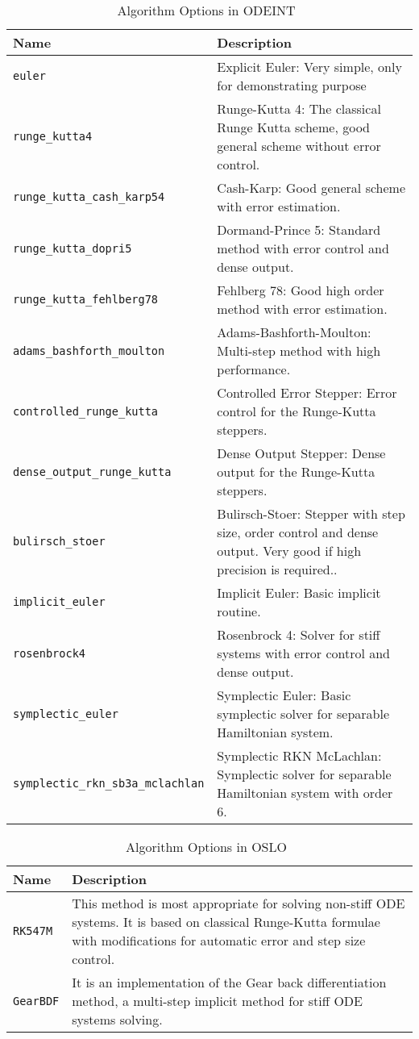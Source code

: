 \begin{table}[ht]
\begin{tabular}{ p{} p{} }
	\textbf{Name} & \textbf{Description} \\
	\toprule
	\verb|euler| & Explicit Euler: Very simple, only for demonstrating purpose\\ \hline
	\verb|runge_kutta4| & Runge-Kutta 4: The classical Runge Kutta scheme, good general scheme without error control.\\ \hline
	\verb|runge_kutta_cash_karp54| & Cash-Karp: Good general scheme with error estimation.\\ \hline
	\verb|runge_kutta_dopri5| & Dormand-Prince 5: Standard method with error control and dense output.\\ \hline
	\verb|runge_kutta_fehlberg78| & Fehlberg 78: Good high order method with error estimation.\\ \hline

	\verb|adams_bashforth_moulton| & Adams-Bashforth-Moulton: Multi-step method with high performance.\\ \hline
	\verb|controlled_runge_kutta| & Controlled Error Stepper: Error control for the Runge-Kutta steppers.\\ \hline
	\verb|dense_output_runge_kutta| & Dense Output Stepper: Dense output for the Runge-Kutta steppers.\\ \hline
	\verb|bulirsch_stoer| & Bulirsch-Stoer: Stepper with step size, order control and dense output. Very good if high precision is required..\\ \hline
	\verb|implicit_euler| & Implicit Euler: Basic implicit routine.\\ \hline
	\verb|rosenbrock4| & Rosenbrock 4: Solver for stiff systems with error control and dense output.\\ \hline
	\verb|symplectic_euler| & Symplectic Euler: Basic symplectic solver for separable Hamiltonian system.\\ \hline
	\verb|symplectic_rkn_sb3a_mclachlan| & Symplectic RKN McLachlan: Symplectic solver for separable Hamiltonian system with order 6.\\
	\bottomrule	
\end{tabular}	
\caption{Algorithm Options in ODEINT~\citep{odeintfun}}	
\label{tab_algodeint}
\end{table}

\begin{table}[ht]
\begin{tabular}{ p{} p{} }
	\textbf{Name} & \textbf{Description} \\
	\toprule
	\verb|RK547M| & This method is most appropriate for solving non-stiff ODE systems. It is based on classical Runge-Kutta formulae with modifications for automatic error and step size control.\\ \hline
	\verb|GearBDF| & It is an implementation of the Gear back differentiation method, a multi-step implicit method for stiff ODE systems solving.\\
	\bottomrule	
\end{tabular}	
\caption{Algorithm Options in OSLO~\citep{oslofun}}	
\label{tab_algodeint}
\end{table}
